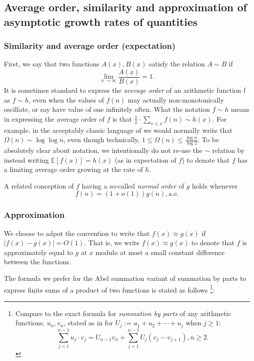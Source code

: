 \documentclass[11pt,reqno,a4letter]{article}
\numberwithin{figure}{section}
\numberwithin{table}{section}
\newcommand{\cf}{\textit{cf.\ }}
\theoremstyle{plain}
\numberwithin{theorem}{section}
\theoremstyle{definition}
\begin{document}
\subsection{Average order, similarity and approximation of asymptotic growth rates of quantities} 

\subsubsection{Similarity and average order (expectation)} 

First, we say that two functions $A(x), B(x)$ satisfy the relation $A \sim B$ if 
\[
\lim_{x \rightarrow \infty} \frac{A(x)}{B(x)} = 1. 
\] 
It is sometimes standard to express the \emph{average order} of an arithmetic function f as 
$f \sim h$, even when the values of $f(n)$ may actually non-monotonically 
oscillate, or say have value of one infinitely often. What the notation $f \sim h$ means in expressing 
the average order of $f$ is that 
$\frac{1}{x} \cdot \sum_{n \leq x} f(n) \sim h(x)$. 
For example, in the acceptably classic language of \cite{HARDYWRIGHT} we would normally write that 
$\Omega(n) \sim \log\log n$, even though technically, 
$1 \leq \Omega(n) \leq \frac{\log n}{\log 2}$. 
To be absolutely clear about notation, we intentionally do not re-use the $\sim$ relation by 
instead writing $\mathbb{E}[f(x)] = h(x)$ (as in expectation of $f$) 
to denote that $f$ has a limiting average order growing at the 
rate of $h$. 

A related conception of $f$ having a so-called \emph{normal order} of $g$ holds whenever 
$$f(n) = (1+o(1)) g(n), \mathrm{a.e.}$$
            
\subsubsection{Approximation} 
     
We choose to adpot the convention to write that $f(x) \approx g(x)$ if $|f(x) - g(x)| = O(1)$. 
That is, we write $f(x) \approx g(x)$ to denote that $f$ is approximately equal to $g$ at $x$ modulo at most a
small constant difference between the functions. 

The formula we prefer for the Abel summation variant of summation by parts 
to express finite sums of a product of two functions is stated as follows 
\cite[\cf \S 4.3]{APOSTOLANUMT} \footnote{
     Compare to the exact formula for \emph{summation by parts} of any arithmetic functions, $u_n,v_n$, 
     stated as in \cite[\S 2.10(ii)]{NISTHB} for $U_j := u_1+u_2+\cdots+u_j$ when $j \geq 1$: 
     \[
     \sum_{j=1}^{n-1} u_j \cdot v_j = U_{n-1} v_n + \sum_{j=1}^{n-1} U_j \left(v_j - v_{j+1}\right), n \geq 2. 
     \]
}: 
 
\end{document}
